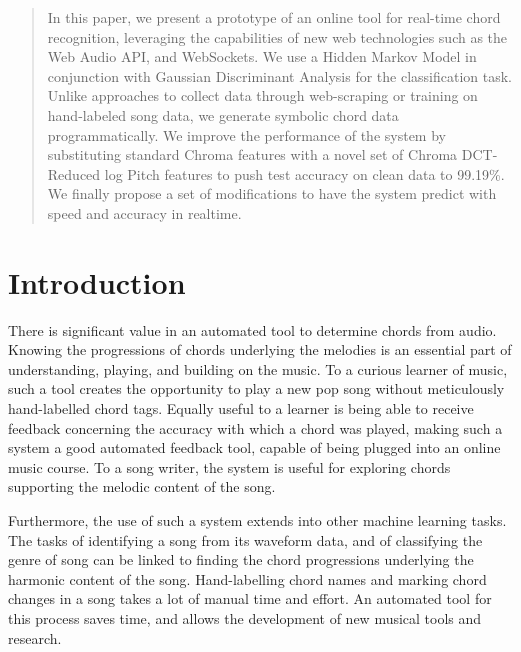 \documentclass{article}
\begin{document}

\begin{abstract}
In this paper, we present a prototype of an online tool for real-time chord
recognition, leveraging the capabilities of new web technologies such as the Web
Audio API, and WebSockets. We use a Hidden Markov Model in conjunction with
Gaussian Discriminant Analysis for the classification task. Unlike approaches to
collect data through web-scraping or training on hand-labeled song data, we
generate symbolic chord data programmatically. We improve the performance of
the system by substituting standard Chroma features with a novel set of
Chroma DCT-Reduced log Pitch features to push test accuracy on clean data to
99.19\%. We finally propose a set of modifications to have the system predict
with speed and accuracy in realtime.
\end{abstract}

\section{Introduction}
\label{intro}
There is significant value in an automated tool to determine chords from audio.
Knowing the progressions of chords underlying the melodies is an essential part
of understanding, playing, and building on the music. To a curious learner of
music, such a tool creates the opportunity to play a new pop song without
meticulously hand-labelled chord tags. Equally useful to a learner is being able
to receive feedback concerning the accuracy with which a chord was played,
making such a system a good automated feedback tool, capable of being plugged
into an online music course. To a song writer, the system is useful for exploring
chords supporting the melodic content of the song.

Furthermore, the use of such a system extends into other machine learning tasks.
The tasks of identifying a song from its waveform data, and of classifying the
genre of song can be linked to finding the chord progressions underlying the
harmonic content of the song. Hand-labelling chord names and marking chord
changes in a song takes a lot of manual time and effort. An automated tool for
this process saves time, and allows the development of new musical tools and
research.
\end{document}
